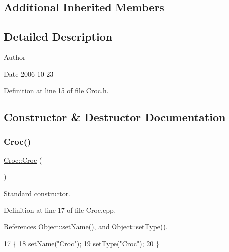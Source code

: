 \subsection*{Additional Inherited Members}


\subsection{Detailed Description}
\begin{DoxyAuthor}{Author}

\end{DoxyAuthor}
\begin{DoxyDate}{Date}
2006-\/10-\/23 
\end{DoxyDate}


Definition at line 15 of file Croc.\+h.



\subsection{Constructor \& Destructor Documentation}
\mbox{\label{classCroc_ac9997a70a0b5b197789f6e2ba80b498b}} 
\subsubsection{\texorpdfstring{Croc()}{Croc()}}
{\footnotesize\ttfamily \hyperlink{classCroc_1_1Croc}{Croc\+::\+Croc} (\begin{DoxyParamCaption}{ }\end{DoxyParamCaption})}



Standard constructor. 



Definition at line 17 of file Croc.\+cpp.



References Object\+::set\+Name(), and Object\+::set\+Type().


\begin{DoxyCode}
17              \{
18   \hyperlink{classObject_ae30fea75683c2d149b6b6d17c09ecd0c}{setName}(\textcolor{stringliteral}{"Croc"});
19   \hyperlink{classObject_aae534cc9d982bcb9b99fd505f2e103a5}{setType}(\textcolor{stringliteral}{"Croc"});
20 \}
\end{DoxyCode}
\mbox{\label{classCroc_ace1e761410c9b53c1ff062a0dadcbd7b}} 
